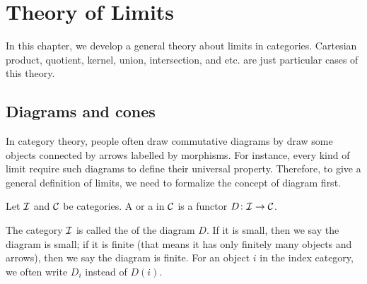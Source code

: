\chapter{Theory of Limits}
  In this chapter, we develop a general theory about limits in categories. Cartesian product, quotient, kernel, union, intersection, and etc. are just particular cases of this theory.
\minitoc
\newpage
\section{Diagrams and cones}
  In category theory, people often draw commutative diagrams by draw some objects connected by arrows labelled by morphisms.
  For instance, every kind of limit require such diagrams to define their universal property.
  Therefore, to give a general definition of limits, we need to formalize the concept of diagram first.
  \begin{defn}
    Let ${\cal I}$ and ${\cal C}$ be categories. A  or a  in ${\cal C}$ is a functor $D\colon {\cal I}\to {\cal C}$.
  \end{defn}
  \begin{rem}
    The category ${\cal I}$ is called the  of the diagram $D$. If it is small, then we say the diagram is small; if it is finite (that means it has only finitely many objects and arrows), then we say the diagram is finite.
    For an object $i$ in the index category, we often write $D_i$ instead of $D(i)$.
  \end{rem}

